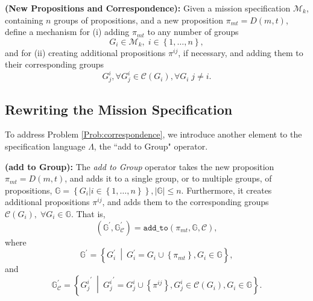 \begin{myProblem}\label{Prob:correspondence} %
	\textbf{(New Propositions and Correspondence):} Given a mission specification $\mathcal{M}_k$, containing $n$ groups of propositions, and a new proposition $\pi_{mt} = D(m, t)$, define a mechanism for (i) adding $\pi_{mt}$ to any number of groups
	$$G_i \in \mathcal{M}_k, \; i \in \left\{ 1, \ldots, n \right\},$$
	and for (ii) creating additional propositions $\pi^{ij}$, if necessary, and adding them to their corresponding groups 
	$$G_j^i, \forall G_j^i \in \mathcal{C}(G_i), \forall G_i \; j \not = i.$$
\end{myProblem}

\subsection{Rewriting the Mission Specification}\label{rewriting}

To address Problem \ref{Prob:correspondence}, we introduce another element to the specification language $\Lambda$, the ``add to Group" operator.

\begin{myDefinition}\label{Def:addto}
	\textbf{(add to Group):} The \emph{add to Group} operator takes the new proposition $\pi_{mt} = D(m,t)$, and adds it to a single group, or to multiple groups, of propositions, $\mathbb{G} = \left\{ G_i | i \in \left\{ 1, \ldots, n \right\}\right\}, |\mathbb{G}| \leq n$.
	Furthermore, it creates additional propositions $\pi^{ij}$, and adds them to the corresponding groups $\mathcal{C}(G_i), \; \forall G_i \in \mathbb{G}$. 
	That is,
	\begin{equation}
		(\mathbb{G}^\prime, \mathbb{G}_{\mathcal{C}}^\prime) = \texttt{add\_to}(\pi_{mt}, \mathbb{G}, \mathcal{C}),
	\end{equation}
	where 
	$$\mathbb{G}^\prime = \left\{ G_i^\prime \: \middle| \: G_i^\prime = G_i \cup \left\{ \pi_{mt} \right\}, G_i \in \mathbb{G} \right\},$$
	and
	$$\mathbb{G}_{\mathcal{C}}^\prime = \left\{{G_j^i}^\prime \: \middle| \: {G_j^i}^\prime = G_j^i \cup \left\{ \pi^{ij} \right\}, G_j^i \in \mathcal{C}(G_i), G_i \in \mathbb{G} \right\}.$$
\end{myDefinition}

